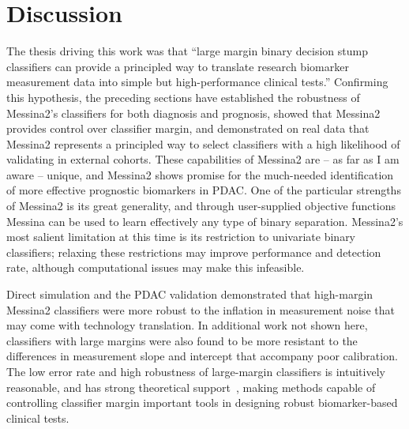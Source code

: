 \documentclass[dissertation.tex]{subfiles}
\begin{document}
\section{Discussion}
The thesis driving this work was that ``large margin binary decision stump classifiers can provide a principled way to translate research biomarker measurement data into simple but high-performance clinical tests.''  Confirming this hypothesis, the preceding sections have established the robustness of Messina2's classifiers for both diagnosis and prognosis, showed that Messina2 provides control over classifier margin, and demonstrated on real data that Messina2 represents a principled way to select classifiers with a high likelihood of validating in external cohorts.  These capabilities of Messina2 are -- as far as I am aware -- unique, and Messina2 shows promise for the much-needed identification of more effective prognostic biomarkers in \gls{PDAC}.  One of the particular strengths of Messina2 is its great generality, and through user-supplied objective functions Messina can be used to learn effectively any type of binary separation.  Messina2's most salient limitation at this time is its restriction to univariate binary classifiers; relaxing these restrictions may improve performance and detection rate, although computational issues may make this infeasible.

Direct simulation and the \gls{PDAC} validation demonstrated that high-margin Messina2 classifiers were more robust to the inflation in measurement noise that may come with technology translation.  In additional work not shown here, classifiers with large margins were also found to be more resistant to the differences in measurement slope and intercept that accompany poor calibration.  The low error rate and high robustness of large-margin classifiers is intuitively reasonable, and has strong theoretical support~\cite{Vapnik2000}, making methods capable of controlling classifier margin important tools in designing robust biomarker-based clinical tests.
\end{document}
